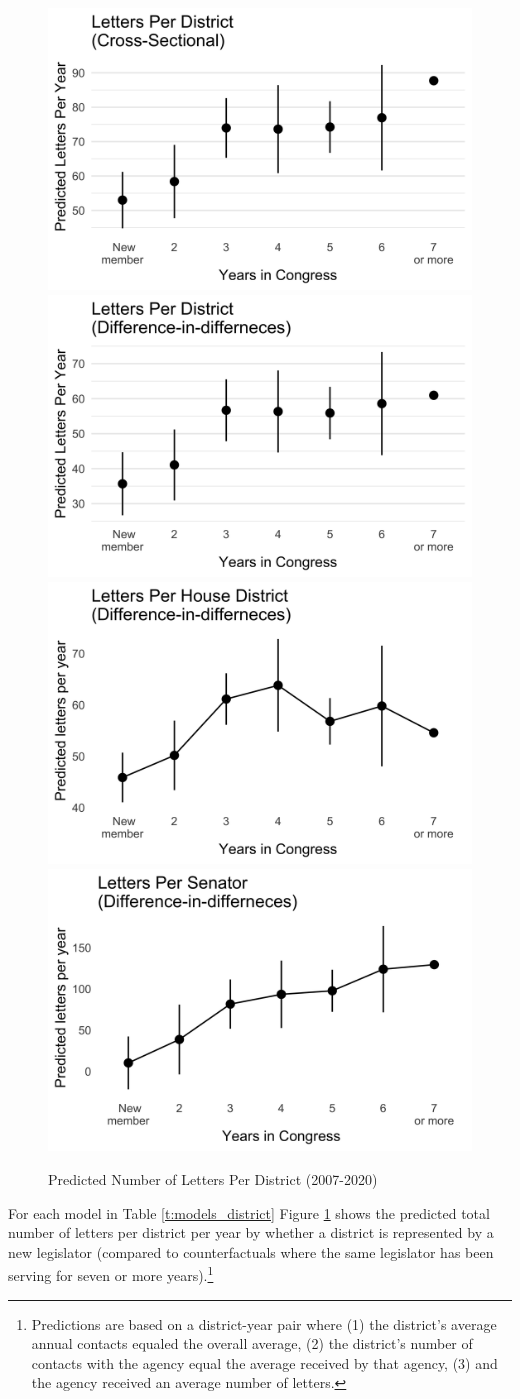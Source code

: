 \documentclass[12pt]{article}
\begin{document}
\begin{figure}[hbt!]
\centering
\caption{Predicted Number of Letters Per District (2007-2020)} \label{f:m-district-predicted}
\includegraphics[width = .49\textwidth]{figs/m-district-predicted-1}
\includegraphics[width = .49\textwidth]{figs/m-district-predicted-3}
\includegraphics[width = .49\textwidth]{figs/m-district-predicted-house-1}
\includegraphics[width = .49\textwidth]{figs/m-district-predicted-senate-1}
\end{figure}

For each model in Table \ref{t:models_district} Figure \ref{f:m-district-predicted} shows the predicted total number of letters per district per year by whether a district is represented by a new legislator (compared to counterfactuals where the same legislator has been serving for seven or more years).\footnote{Predictions are based on a district-year pair where (1) the district's average annual contacts equaled the overall average, (2) the district's number of contacts with the agency equal the average received by that agency, (3) and the agency received an average number of letters.} 
\end{document}
